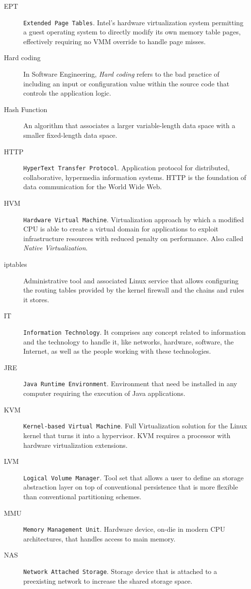 \begin{description}
\item[EPT] \texttt{Extended Page Tables}. Intel's hardware virtualization system permitting a guest operating system to directly modify its own memory table pages, effectively requiring no VMM override to handle page misses.
\item[Hard coding] In Software Engineering, \emph{Hard coding} refers to the bad practice of including an input or configuration value within the source code that controls the application logic.
\item[Hash Function] An algorithm that associates a larger variable-length data space with a smaller fixed-length data space.
\item[HTTP] \texttt{HyperText Transfer Protocol}. Application protocol for distributed, collaborative, hypermedia information systems. HTTP is the foundation of data communication for the World Wide Web.
\item[HVM] \texttt{Hardware Virtual Machine}. Virtualization approach by which a modified CPU is able to create a virtual domain for applications to exploit infrastructure resources with reduced penalty on performance. Also called \emph{Native Virtualization}.
\item[iptables] Administrative tool and associated Linux service that allows configuring the routing tables provided by the kernel firewall and the chains and rules it stores.
\item[IT] \texttt{Information Technology}. It comprises any concept related to information and the technology to handle it, like networks, hardware, software, the Internet, as well as the people working with these technologies.
\item[JRE] \texttt{Java Runtime Environment}. Environment that need be installed in any computer requiring the execution of Java applications.
\item[KVM] \texttt{Kernel-based Virtual Machine}. Full Virtualization solution for the Linux kernel that turns it into a hypervisor. KVM requires a processor with hardware virtualization extensions.
\item[LVM] \texttt{Logical Volume Manager}. Tool set that allows a user to define an storage abstraction layer on top of conventional persistence that is more flexible than conventional partitioning schemes.
\item[MMU] \texttt{Memory Management Unit}. Hardware device, on-die in modern CPU architectures, that handles access to main memory.
\item[NAS] \texttt{Network Attached Storage}. Storage device that is attached to a preexisting network to increase the shared storage space.

\end{description}
